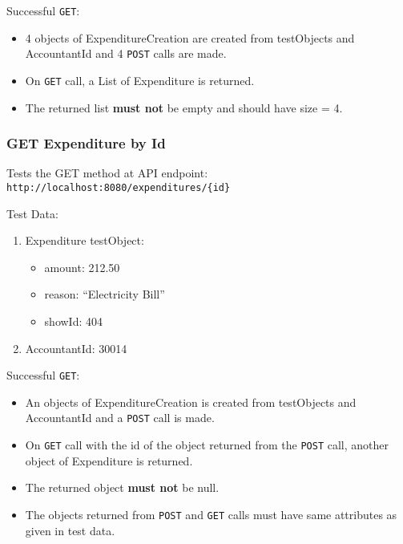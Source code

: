 \documentclass[]{article}
\providecommand{\tightlist}{%
  \setlength{\itemsep}{0pt}\setlength{\parskip}{0pt}}
\begin{document}
Successful \texttt{GET}:

\begin{itemize}
\tightlist
\item
  4 objects of ExpenditureCreation are created from testObjects and
  AccountantId and 4 \texttt{POST} calls are made.
\item
  On \texttt{GET} call, a List of Expenditure is returned.
\item
  The returned list \textbf{must not} be empty and should have size = 4.
\end{itemize}

\hypertarget{get-expenditure-by-id}{%
\subsubsection{GET Expenditure by Id}\label{get-expenditure-by-id}}

Tests the GET method at API endpoint:
\texttt{http://localhost:8080/expenditures/\{id\}}

Test Data:

\begin{enumerate}
\def\labelenumi{\arabic{enumi}.}
\tightlist
\item
  Expenditure testObject:

  \begin{itemize}
  \tightlist
  \item
    amount: 212.50
  \item
    reason: ``Electricity Bill''
  \item
    showId: 404
  \end{itemize}
\item
  AccountantId: 30014
\end{enumerate}

Successful \texttt{GET}:

\begin{itemize}
\tightlist
\item
  An objects of ExpenditureCreation is created from testObjects and
  AccountantId and a \texttt{POST} call is made.
\item
  On \texttt{GET} call with the id of the object returned from the
  \texttt{POST} call, another object of Expenditure is returned.
\item
  The returned object \textbf{must not} be null.
\item
  The objects returned from \texttt{POST} and \texttt{GET} calls must
  have same attributes as given in test data.
\end{itemize}
\end{document}
